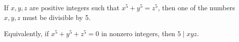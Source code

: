 If $x, y, z$ are positive integers such that $x^5 + y^5 = z^5$, then one of the numbers $x, y, z$ must be divisible by 5.

Equivalently, if $x^5 + y^5 + z^5 = 0$ in nonzero integers, then $5 \mid xyz$.

